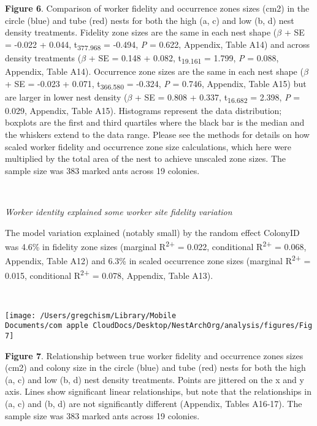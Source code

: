 \documentclass[3p]{elsarticle} %
\begin{document}
\textbf{Figure 6}. Comparison of worker fidelity and occurrence zones
sizes (cm2) in the circle (blue) and tube (red) nests for both the high
(a, c) and low (b, d) nest density treatments. Fidelity zone sizes are
the same in each nest shape (\(\beta\) + SE = -0.022 + 0.044,
t\textsubscript{377.968} = -0.494, \emph{P} = 0.622, Appendix, Table
A14) and across density treatments (\(\beta\) + SE = 0.148 + 0.082,
t\textsubscript{19.161} = 1.799, \emph{P} = 0.088, Appendix, Table A14).
Occurrence zone sizes are the same in each nest shape (\(\beta\) + SE =
-0.023 + 0.071, t\textsubscript{366.580} = -0.324, \emph{P} = 0.746,
Appendix, Table A15) but are larger in lower nest density (\(\beta\) +
SE = 0.808 + 0.337, t\textsubscript{16.682} = 2.398, \emph{P} = 0.029,
Appendix, Table A15). Histograms represent the data distribution;
boxplots are the first and third quartiles where the black bar is the
median and the whiskers extend to the data range. Please see the methods
for details on how scaled worker fidelity and occurrence zone size
calculations, which here were multiplied by the total area of the nest
to achieve unscaled zone sizes. The sample size was 383 marked ants
across 19 colonies.

~

\emph{Worker identity explained some worker site fidelity variation}

The model variation explained (notably small) by the random effect
ColonyID was 4.6\% in fidelity zone sizes (marginal
R\textsuperscript{2+} = 0.022, conditional R\textsuperscript{2+} =
0.068, Appendix, Table A12) and 6.3\% in scaled occurrence zone sizes
(marginal R\textsuperscript{2+} = 0.015, conditional
R\textsuperscript{2+} = 0.078, Appendix, Table A13).

~

\begin{flushleft}\texttt{[image: /Users/gregchism/Library/Mobile Documents/com~apple~CloudDocs/Desktop/NestArchOrg/analysis/figures/Fig7]} \end{flushleft}

\textbf{Figure 7}. Relationship between true worker fidelity and
occurrence zones sizes (cm2) and colony size in the circle (blue) and
tube (red) nests for both the high (a, c) and low (b, d) nest density
treatments. Points are jittered on the x and y axis. Lines show
significant linear relationships, but note that the relationships in (a,
c) and (b, d) are not significantly different (Appendix, Tables A16-17).
The sample size was 383 marked ants across 19 colonies.
\end{document}
